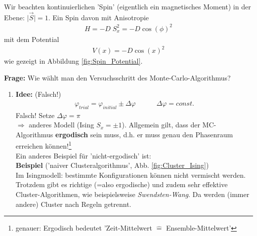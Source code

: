\documentclass[12pt]{article}
\begin{document}
Wir beachten kontinuierlichen 'Spin' (eigentlich ein magnetisches Moment) in der Ebene: $\vert \vec{S} \vert = 1$. Ein Spin davon mit Anisotropie \begin{align*}
H=-D \; S_x^2 = -D \cos(\phi)^2
\end{align*} mit dem Potential
\begin{align*}
V(x) = -D \cos(x)^2
\end{align*}
wie gezeigt in Abbildung \ref{fig:Spin_Potential}.

\textbf{Frage:} Wie wählt man den Versuchsschritt des Monte-Carlo-Algorithmus?
\begin{enumerate}

\item \textbf{Idee:} (Falsch!)
\begin{align*}
\varphi_{trial} = \varphi_{initial} \pm \Delta \varphi \quad \quad \quad \Delta \varphi = const.
\end{align*}
Falsch! Setze $\Delta \varphi = \pi$ \\
$ \Rightarrow$ anderes Modell (Ising $S_x = \pm 1$). Allgemein gilt, dass der MC-Algorithmus \textbf{ergodisch} sein muss, d.h. er muss genau den Phasenraum erreichen können!\footnote{genauer: Ergodisch bedeutet 'Zeit-Mittelwert $\widehat{=}$ Ensemble-Mittelwert'} \\
Ein anderes Beispiel für 'nicht-ergodisch' ist: \\
\textbf{Beispiel} ('naiver Clusteralgorithmus', Abb. \ref{fig:Cluster_Ising}) \\
Im Isingmodell: bestimmte Konfigurationen können nicht vermischt werden. Trotzdem gibt es richtige (=also ergodische) und zudem sehr effektive Cluster-Algorithmen, wie beispielsweise \textit{Swendsten-Wang}. Da werden (immer andere) Cluster nach Regeln getrennt. 


\end{enumerate}
\end{document}
